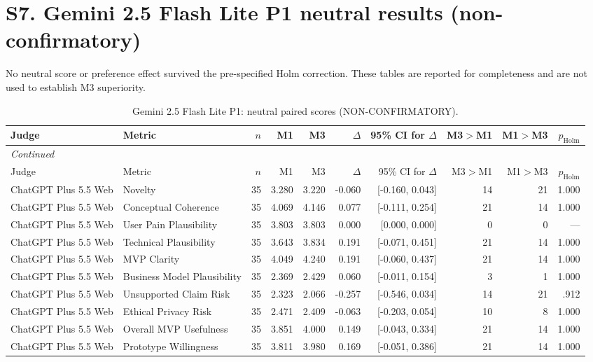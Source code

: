 \documentclass[10pt]{article}
\begin{document}
\section*{S7. Gemini 2.5 Flash Lite P1 neutral results (non-confirmatory)}
No neutral score or preference effect survived the pre-specified Holm correction.
These tables are reported for completeness and are not used to establish M3 superiority.
\begin{landscape}
\small
\setlength{\LTcapwidth}{\textwidth}
\begin{longtable}{llrrrrrrrr}
\caption{Gemini 2.5 Flash Lite P1: neutral paired scores (NON-CONFIRMATORY).}\label{tab:s12-neu25p1}\\
\toprule
Judge & Metric & $n$ & M1 & M3 & $\Delta$ & 95\% CI for $\Delta$ & M3$>$M1 & M1$>$M3 & $p_{\mathrm{Holm}}$ \\
\midrule\endfirsthead
\multicolumn{10}{l}{\small\itshape Continued}\\
\toprule Judge & Metric & $n$ & M1 & M3 & $\Delta$ & 95\% CI for $\Delta$ & M3$>$M1 & M1$>$M3 & $p_{\mathrm{Holm}}$ \\ \midrule\endhead
\bottomrule\endfoot
ChatGPT Plus 5.5 Web & Novelty & 35 & 3.280 & 3.220 & -0.060 & [-0.160, 0.043] & 14 & 21 & 1.000 \\
ChatGPT Plus 5.5 Web & Conceptual Coherence & 35 & 4.069 & 4.146 & 0.077 & [-0.111, 0.254] & 21 & 14 & 1.000 \\
ChatGPT Plus 5.5 Web & User Pain Plausibility & 35 & 3.803 & 3.803 & 0.000 & [0.000, 0.000] & 0 & 0 & — \\
ChatGPT Plus 5.5 Web & Technical Plausibility & 35 & 3.643 & 3.834 & 0.191 & [-0.071, 0.451] & 21 & 14 & 1.000 \\
ChatGPT Plus 5.5 Web & MVP Clarity & 35 & 4.049 & 4.240 & 0.191 & [-0.060, 0.437] & 21 & 14 & 1.000 \\
ChatGPT Plus 5.5 Web & Business Model Plausibility & 35 & 2.369 & 2.429 & 0.060 & [-0.011, 0.154] & 3 & 1 & 1.000 \\
ChatGPT Plus 5.5 Web & Unsupported Claim Risk & 35 & 2.323 & 2.066 & -0.257 & [-0.546, 0.034] & 14 & 21 & .912 \\
ChatGPT Plus 5.5 Web & Ethical Privacy Risk & 35 & 2.471 & 2.409 & -0.063 & [-0.203, 0.054] & 10 & 8 & 1.000 \\
ChatGPT Plus 5.5 Web & Overall MVP Usefulness & 35 & 3.851 & 4.000 & 0.149 & [-0.043, 0.334] & 21 & 14 & 1.000 \\
ChatGPT Plus 5.5 Web & Prototype Willingness & 35 & 3.811 & 3.980 & 0.169 & [-0.051, 0.386] & 21 & 14 & 1.000 \\

\end{longtable}
\end{landscape}
\end{document}
